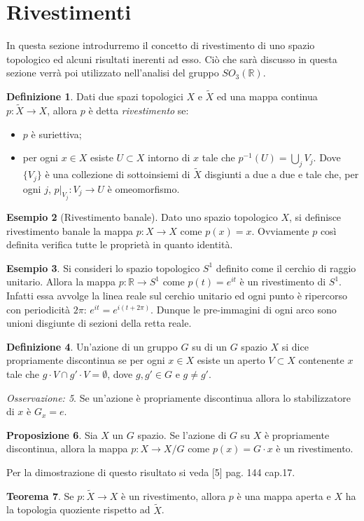 \documentclass[12pt,a4paper]{report}
\theoremstyle{definition}
\newtheorem{Def}{Definizione}[chapter]
\newtheorem{Theo}[Def]{Teorema}
\newtheorem{Prop}[Def]{Proposizione}
\theoremstyle{definition}
\newtheorem{Ex}[Def]{Esempio}
\theoremstyle{definition}
\theoremstyle{remark}
\newtheorem{Obs}[Def]{Osservazione:}
\begin{document}
\section{Rivestimenti}
In questa sezione introdurremo il concetto di rivestimento di uno spazio topologico ed alcuni risultati inerenti ad esso. Ciò che sarà discusso in questa sezione verrà poi utilizzato nell'analisi del gruppo $SO_3(\mathbb{R})$.
\begin{Def}
	Dati due spazi topologici $X$ e $\tilde{X}$ ed una mappa continua $p:\tilde{X}\rightarrow X$, allora $p$ è detta \textit{rivestimento} se:
	\begin{itemize}
		\item $p$ è suriettiva;
		\item per ogni $x\in X$ esiste $U\subset X$ intorno di $x$ tale che $p^{-1}(U)=\bigcup_j V_j$. Dove $\{V_j\}$ è una collezione di sottoinsiemi di $\tilde{X}$ disgiunti a due a due e tale che, per ogni $j$, $p\rvert_{V_j}:V_j\rightarrow U$ è omeomorfismo. 
	\end{itemize}
\end{Def}
\begin{Ex}[Rivestimento banale]
	Dato uno spazio topologico $X$, si definisce rivestimento banale la mappa $p:X\rightarrow X$ come $p(x)=x$. Ovviamente $p$ così definita verifica tutte le proprietà in quanto identità.
\end{Ex}
\begin{Ex}
	Si consideri lo spazio topologico $S^1$ definito come il cerchio di raggio unitario. Allora la mappa $p:\mathbb{R}\rightarrow S^1$ come $p(t)=e^{it}$ è un rivestimento di $S^1$. Infatti essa avvolge la linea reale sul cerchio unitario ed ogni punto è ripercorso con periodicità $2\pi$: $e^{it}=e^{i(t+2\pi)}$. Dunque le pre-immagini di ogni arco sono unioni disgiunte di sezioni della retta reale.
\end{Ex}
\begin{Def}
	Un'azione di un gruppo $G$ su di un $G$ spazio $X$ si dice propriamente discontinua se per ogni $x\in X$ esiste un aperto $V\subset X$ contenente $x$ tale che $g\cdot V\cap g'\cdot V=\emptyset$, dove $g,g'\in G$ e $g\neq g'$.
\end{Def}
\begin{Obs}
	Se un'azione è propriamente discontinua allora lo stabilizzatore di $x$ è $G_x={e}$.
\end{Obs}
\begin{Prop}
	Sia $X$ un $G$ spazio. Se l'azione di $G$ su $X$ è propriamente discontinua, allora la mappa $p:X\rightarrow X/G$ come $p(x)=G\cdot x$ è un rivestimento.
\end{Prop}
Per la dimostrazione di questo risultato si veda [5] pag. 144 cap.17.
\begin{Theo}
	Se $p:\tilde{X}\rightarrow X$ è un rivestimento, allora $p$ è una mappa aperta e $X$ ha la topologia quoziente rispetto ad $\tilde{X}$.
\end{Theo}
\end{document}
